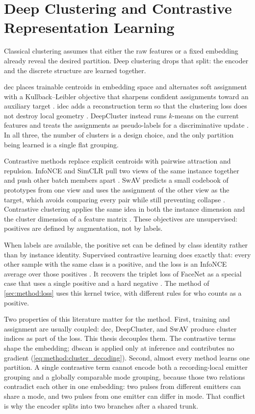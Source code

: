 \section{Deep Clustering and Contrastive Representation Learning}\label{sec:related:deep_clustering}

Classical clustering assumes that either the raw features or a fixed embedding already reveal the desired partition.
Deep clustering drops that split: the encoder and the discrete structure are learned together.

\Gls{dec} places trainable centroids in embedding space and alternates soft assignment with a Kullback--Leibler objective that sharpens confident assignments toward an auxiliary target \parencite{xie2016unsupervised}.
\Gls{idec} adds a reconstruction term so that the clustering loss does not destroy local geometry \parencite{guo2017idec}.
DeepCluster instead runs \(k\)-means on the current features and treats the assignments as pseudo-labels for a discriminative update \parencite{caron2018deepcluster}.
In all three, the number of clusters is a design choice, and the only partition being learned is a single flat grouping.

Contrastive methods replace explicit centroids with pairwise attraction and repulsion.
InfoNCE and SimCLR pull two views of the same instance together and push other batch members apart \parencite{oord2018representation,chen2020simclr}.
SwAV predicts a small codebook of prototypes from one view and uses the assignment of the other view as the target, which avoids comparing every pair while still preventing collapse \parencite{caron2020swav}.
Contrastive clustering applies the same idea in both the instance dimension and the cluster dimension of a feature matrix \parencite{li2021contrastive}.
These objectives are unsupervised: positives are defined by augmentation, not by labels.

When labels are available, the positive set can be defined by class identity rather than by instance identity.
Supervised contrastive learning does exactly that: every other sample with the same class is a positive, and the loss is an InfoNCE average over those positives \parencite{khosla2020supcon}.
It recovers the triplet loss of FaceNet as a special case that uses a single positive and a hard negative \parencite{schroff2015facenet}.
The method of \cref{sec:method:loss} uses this kernel twice, with different rules for who counts as a positive.

Two properties of this literature matter for the method.
First, training and assignment are usually coupled: \gls{dec}, DeepCluster, and SwAV produce cluster indices as part of the loss.
This thesis decouples them.
The contrastive terms shape the embedding; \gls{dbscan} is applied only at inference and contributes no gradient (\cref{eq:method:cluster_decoding}).
Second, almost every method learns one partition.
A single contrastive term cannot encode both a recording-local emitter grouping and a globally comparable mode grouping, because those two relations contradict each other in one embedding: two pulses from different emitters can share a mode, and two pulses from one emitter can differ in mode.
That conflict is why the encoder splits into two branches after a shared trunk.
